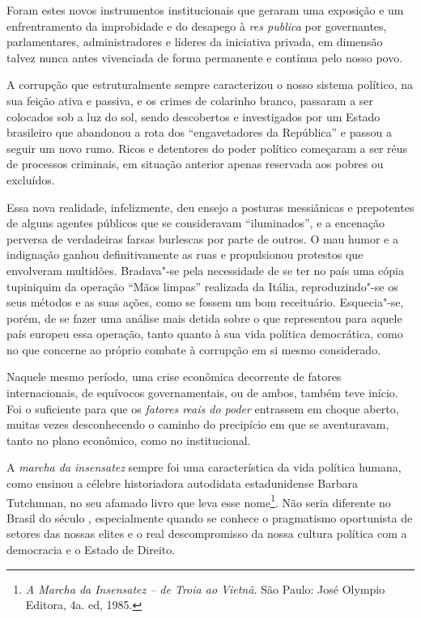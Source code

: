 Foram estes novos instrumentos institucionais que geraram uma exposição
e um enfrentramento da improbidade e do desapego à \emph{res publica}
por governantes, parlamentares, administradores e líderes da iniciativa
privada, em dimensão talvez nunca antes vivenciada de forma permanente e
contínua pelo nosso povo.

A corrupção que estruturalmente sempre caracterizou o nosso sistema
político, na sua feição ativa e passiva, e os crimes de colarinho
branco, passaram a ser colocados sob a luz do sol, sendo descobertos e
investigados por um Estado brasileiro que abandonou a rota dos
``engavetadores da República'' e passou a seguir um novo rumo. Ricos e
detentores do poder político começaram a ser réus de processos
criminais, em situação anterior apenas reservada aos pobres ou
excluídos.

Essa nova realidade, infelizmente, deu ensejo a posturas messiânicas e
prepotentes de alguns agentes públicos que se consideravam
``iluminados'', e a encenação perversa de verdadeiras farsas burlescas
por parte de outros. O mau humor e a indignação ganhou definitivamente
as ruas e propulsionou protestos que envolveram multidões. Bradava"-se
pela necessidade de se ter no país uma cópia tupiniquim da operação
``Mãos limpas'' realizada da Itália, reproduzindo"-se os seus
métodos e as suas ações, como se fossem um bom receituário. Esquecia"-se,
porém, de se fazer uma análise mais detida sobre o que representou para
aquele país europeu essa operação, tanto quanto à sua vida política
democrática, como no que concerne ao próprio combate à corrupção em si
mesmo considerado.

Naquele mesmo período, uma crise econômica decorrente de fatores
internacionais, de equívocos governamentais, ou de ambos, também teve
início. Foi o suficiente para que os \emph{fatores reais do poder}
entrassem em choque aberto, muitas vezes desconhecendo o caminho do
precipício em que se aventuravam, tanto no plano econômico, como no
institucional.

A \emph{marcha da insensatez} sempre foi uma característica da vida
política humana, como ensinou a célebre historiadora autodidata
estadunidense Barbara Tutchmnan, no seu afamado livro que leva esse
nome\footnote{\emph{A Marcha da Insensatez -- de Troia ao Vietnã.} São
  Paulo: José Olympio Editora, 4a. ed, 1985.}. Não seria diferente no
Brasil do século , especialmente quando se conhece o pragmatismo
oportunista de setores das nossas elites e o real descompromisso da
nossa cultura política com a democracia e o Estado de Direito.

